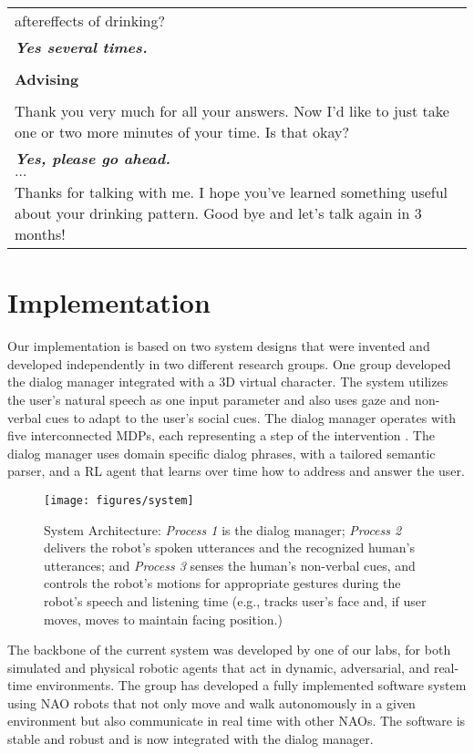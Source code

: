 \documentclass[letterpaper]{article}
\begin{document}
\begin{sloppy}
\begin{table}[!h]
{\begin{tabular}{ p{80mm}  }
aftereffects of drinking? \\
\bf{\em{Yes several times.}} \\
\\
    \hline
    \textbf{Advising} \\
    \\
     Thank you very much for all your answers. Now I'd like to just take one or two more minutes of 
your time. Is that okay? \\
\bf{\em{Yes, please go ahead.}}\\
$\ldots$\\
Thanks for talking with me. I hope you've learned something useful about your drinking pattern.  
Good bye and let's talk again in 3 months! \\
    \hline
\end{tabular}
}
\end{table}


\section{Implementation} 

Our implementation is based on two system designs that were 
invented and developed independently in two different research groups. One  
group developed the dialog manager integrated with a 3D virtual 
character.  The system utilizes the user's natural speech as one input parameter and also uses gaze
and non-verbal cues to adapt to the user's social cues. The dialog manager  operates with five
interconnected MDPs, each representing a step of the intervention \cite{YASCLL14}. The dialog 
manager uses domain specific dialog phrases, with a tailored semantic parser, and a RL agent that 
learns over time how to address and answer the user. 

\begin{figure}[!t] 
\centering 
\texttt{[image: figures/system]} 
\caption{System Architecture: {\em Process 1} is the dialog manager; {\em Process 2} delivers the 
robot's spoken utterances and the recognized human's utterances; and {\em Process 3} senses the 
human's non-verbal cues, and controls the robot's motions for appropriate gestures during the 
robot's speech and listening time (e.g., tracks user's face and, if user moves, moves to maintain 
facing position.)} 
\label{fig:system} 
\end{figure}

The backbone of the current system was developed by one of our 
labs,
for both simulated and
physical robotic agents that act in dynamic, adversarial, and real-time environments.    
The group has developed a fully implemented software system  using NAO robots that not 
only move and walk autonomously in a given environment but 
also communicate in real time with other NAOs. The 
software is stable and
robust and is now integrated with the dialog manager.


\end{sloppy}
\end{document}
